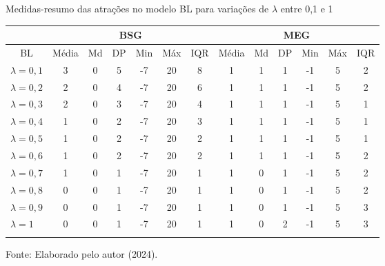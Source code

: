\begin{tabela}[H]
	\small
	\centering
	\caption{Medidas-resumo das atrações no modelo BL para variações de $\lambda$ entre 0,1 e 1}
	\begin{tabular}{l|c c c c c c|c c c c c c}
		\Xhline{2\arrayrulewidth}
		& \multicolumn{6}{c|}{BSG} & \multicolumn{6}{c}{MEG} \\ \hline
		\multicolumn{1}{c|}{BL} & Média & Md & DP & Min & Máx & IQR & Média & Md & DP & Min & Máx & IQR \\ \hline
		$\lambda = 0,1$ & 3 & 0 & 5 & -7 & 20 & 8 & 1 & 1 & 1 & -1 & 5 & 2 \\
		$\lambda = 0,2$ & 2 & 0 & 4 & -7 & 20 & 6 & 1 & 1 & 1 & -1 & 5 & 2 \\
		$\lambda = 0,3$ & 2 & 0 & 3 & -7 & 20 & 4 & 1 & 1 & 1 & -1 & 5 & 1 \\
		$\lambda = 0,4$ & 1 & 0 & 2 & -7 & 20 & 3 & 1 & 1 & 1 & -1 & 5 & 1 \\
		$\lambda = 0,5$ & 1 & 0 & 2 & -7 & 20 & 2 & 1 & 1 & 1 & -1 & 5 & 1 \\
		$\lambda = 0,6$ & 1 & 0 & 2 & -7 & 20 & 2 & 1 & 1 & 1 & -1 & 5 & 2 \\
		$\lambda = 0,7$ & 1 & 0 & 1 & -7 & 20 & 1 & 1 & 0 & 1 & -1 & 5 & 2 \\
		$\lambda = 0,8$ & 0 & 0 & 1 & -7 & 20 & 1 & 1 & 0 & 1 & -1 & 5 & 2 \\
		$\lambda = 0,9$ & 0 & 0 & 1 & -7 & 20 & 1 & 1 & 0 & 1 & -1 & 5 & 3 \\
		$\lambda = 1$ & 0 & 0 & 1 & -7 & 20 & 1 & 1 & 0 & 2 & -1 & 5 & 3 \\
		\Xhline{2\arrayrulewidth}
	\end{tabular}
	\label{tabela_6}
	\caption*{\fontsize{10}{12}\selectfont Fonte: Elaborado pelo autor (2024).}
\end{tabela}
